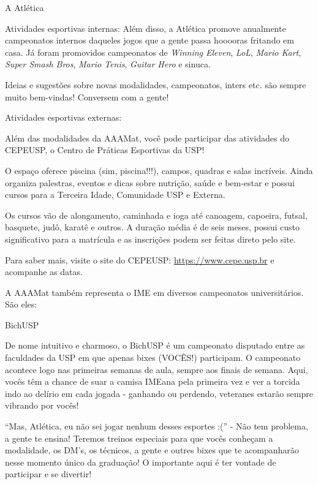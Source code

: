 \begin{secao}{A Atlética}
\begin{subsecao}{Atividades esportivas internas:}
Além disso, a Atlética promove anualmente campeonatos internos daqueles jogos
que a gente passa hooooras fritando em casa. Já foram promovidos campeonatos de
\textit{Winning Eleven}, \textit{LoL}, \textit{Mario Kart}, \textit{Super Smash Bros}, 
\textit{Mario Tenis}, \textit{Guitar Hero} e 
sinuca.

Ideias e sugestões sobre novas modalidades, campeonatos, inters etc. são
sempre muito bem-vindas! Conversem com a gente!

\end{subsecao}

\begin{subsecao}{Atividades esportivas externas:}

Além das modalidades da AAAMat, você pode participar das atividades do CEPEUSP,
o Centro de Práticas Esportivas da USP! 

O espaço oferece piscina (sim, piscina!!!), campos, quadras e salas incríveis.
Ainda organiza palestras, eventos e dicas sobre nutrição, saúde e bem-estar e 
possui cursos para a Terceira Idade, Comunidade USP e Externa. 

Os cursos vão de alongamento, caminhada e ioga até canoagem, capoeira, futsal, 
basquete, judô, karatê e outros. A duração média é de seis meses, possui custo 
significativo para a matrícula e as inscrições podem ser feitas direto pelo site. 

Para saber mais, visite o site do CEPEUSP: \url{https://www.cepe.usp.br} e acompanhe 
as datas. 

\end{subsecao}

A AAAMat também representa o IME em diversos campeonatos universitários. São
eles:

\begin{subsecao}{BichUSP}

De nome intuitivo e charmoso, o BichUSP é um campeonato disputado entre as
faculdades da USP em que apenas bixes (VOCÊS!) participam. O campeonato
acontece logo nas primeiras semanas de aula, sempre aos finais de semana. Aqui,
vocês têm a chance de suar a camisa IMEana pela primeira vez e ver a torcida
indo ao delírio em cada jogada - ganhando ou perdendo, veteranes estarão
sempre vibrando por vocês!

``Mas, Atlética, eu não sei jogar nenhum desses esportes :('' - Não tem
problema, a gente te ensina! Teremos treinos especiais para que vocês conheçam
a modalidade, os DM’s, os técnicos, a gente e outres bixes que te
acompanharão nesse momento único da graduação! O importante aqui é ter vontade
de participar e se divertir!


\end{subsecao}
\end{secao}
